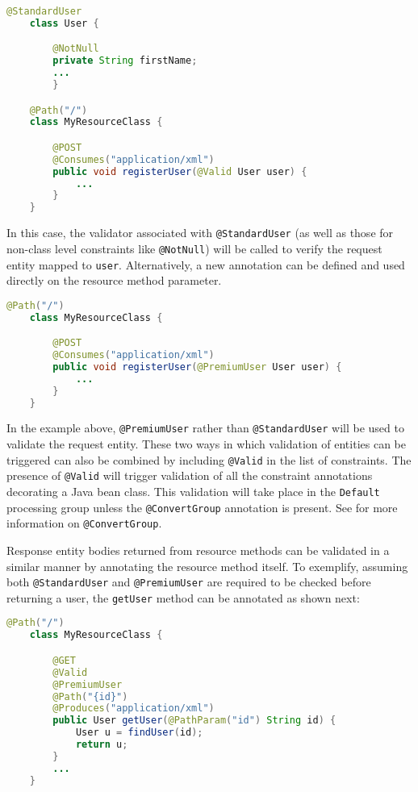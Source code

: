 \begin{lstlisting}[language=Java]
    @StandardUser
    class User {

        @NotNull
        private String firstName;
        ...
        }

    @Path("/")
    class MyResourceClass {

        @POST
        @Consumes("application/xml")
        public void registerUser(@Valid User user) {
            ...
        }
    }
\end{lstlisting}

In this case, the validator associated with \lstinline{@StandardUser} (as well as those for non-class level constraints
like \lstinline{@NotNull}) will be called to verify the request entity mapped to \lstinline{user}. Alternatively, a new
annotation can be defined and used directly on the resource method parameter.

\begin{lstlisting}[language=Java]
    @Path("/")
    class MyResourceClass {

        @POST
        @Consumes("application/xml")
        public void registerUser(@PremiumUser User user) {
            ...
        }
    }
\end{lstlisting}

In the example above, \lstinline{@PremiumUser} rather than \lstinline{@StandardUser} will be used to validate the
request entity. These two ways in which validation of entities can be triggered can also be combined by including
\lstinline{@Valid} in the list of constraints. The presence of \lstinline{@Valid} will trigger validation of all the
constraint annotations decorating a Java bean class. This validation will take place in the \lstinline{Default}
processing group unless the \lstinline{@ConvertGroup} annotation is present. See for more information on
\lstinline{@ConvertGroup}.

Response entity bodies returned from resource methods can be validated in a similar manner by annotating the resource
method itself. To exemplify, assuming both \lstinline{@StandardUser} and \lstinline{@PremiumUser} are required to be
checked before returning a user, the \lstinline{getUser} method can be annotated as shown next:

\begin{lstlisting}[language=Java]
    @Path("/")
    class MyResourceClass {

        @GET
        @Valid
        @PremiumUser
        @Path("{id}")
        @Produces("application/xml")
        public User getUser(@PathParam("id") String id) {
            User u = findUser(id);
            return u;
        }
        ...
    }
\end{lstlisting}

